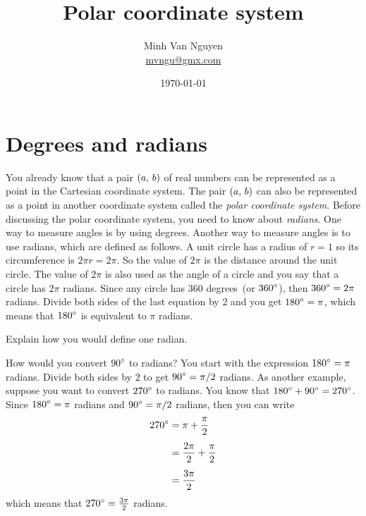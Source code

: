 \documentclass[a4paper,oneside,12pt]{article}
\begin{document}
\title{\Large\bf Polar coordinate system}
\author{%
  Minh Van Nguyen \\
  \url{mvngu@gmx.com}
}
\date{\today}
\maketitle



\section{Degrees and radians}

You already know that a pair $\left\lparen{a},\, {b}\right\rparen$ of real numbers can be
represented as a point in the Cartesian coordinate system.  The pair
$\left\lparen{a},\, {b}\right\rparen$ can also be represented as a point in another
coordinate system called the \emph{polar coordinate system}.  Before
discussing the polar coordinate system, you need to know about
\emph{radians}.  One way to measure angles is by using degrees.
Another way to measure angles is to use radians, which are defined as
follows.  A unit circle has a radius of $r = 1$ so its circumference
is $2 \pi r = 2 \pi$.  So the value of $2 \pi$ is the distance around
the unit circle.  The value of $2\pi$ is also used as the angle of a
circle and you say that a circle has $2\pi$ radians.  Since any circle
has $360$ degrees~(or ${360}^{\circ}$), then ${360}^{\circ} = 2\pi$
radians.  Divide both sides of the last equation by $2$ and you get
${180}^{\circ} = \pi$, which means that ${180}^{\circ}$ is equivalent to
$\pi$ radians.

\begin{exercise}
Explain how you would define one radian.
\end{exercise}


How would you convert ${90}^{\circ}$ to radians?  You start with the
expression ${180}^{\circ} = \pi$ radians.  Divide both sides by $2$ to
get ${90}^{\circ} = \pi / 2$ radians.  As another example, suppose you
want to convert ${270}^{\circ}$ to radians.  You know that
${180}^{\circ} + {90}^{\circ} = {270}^{\circ}$.  Since
${180}^{\circ} = \pi$ radians and ${90}^{\circ} = \pi/2$ radians, then
you can write
\begin{align*}
{270}^{\circ}
&=
\pi + \frac{\pi}{2} \\[4pt]
&=
\frac{2\pi}{2} + \frac{\pi}{2} \\[4pt]
&=
\frac{3\pi}{2}
\end{align*}
which means that ${270}^{\circ} = \frac{3\pi}{2}$ radians.
\end{document}
